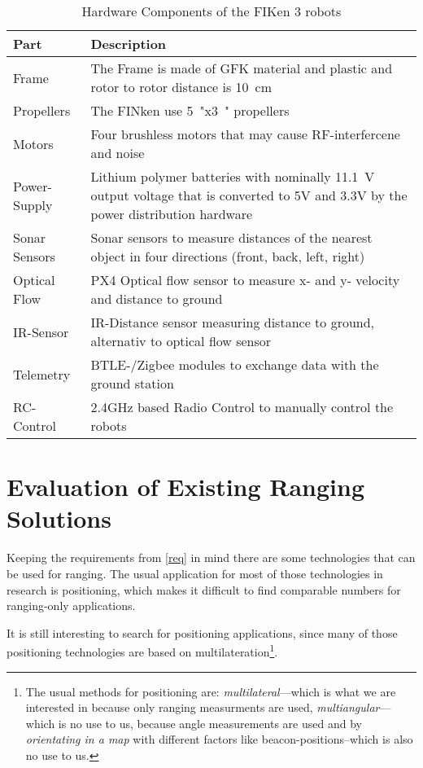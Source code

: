 \begin{table}[H]
	\begin{tabularx}{\columnwidth}{l | X}
	Part & Description \\ \hline
	Frame & The Frame is made of GFK material and plastic and rotor to rotor distance is \SI{10}{\centi\metre} \\
	Propellers & The FINken use \SI{5}{"}x\SI{3}{"} propellers \\
	Motors & Four brushless motors that may cause RF-interfercene and noise \\
	Power-Supply & Lithium polymer batteries with nominally \SI{11.1}{\volt} output voltage that is converted to 5V and 3.3V by the power distribution hardware \\
	Sonar Sensors & Sonar sensors to measure distances of the nearest object in four directions (front, back, left, right) \\
	Optical Flow & PX4 Optical flow sensor to measure x- and y- velocity and distance to ground \\
	IR-Sensor & IR-Distance sensor measuring distance to ground, alternativ to optical flow sensor \\
	Telemetry & BTLE-/Zigbee modules to exchange data with the ground station \\
	RC-Control &  2.4GHz based Radio Control to manually control the robots \\
	\end{tabularx}
	\caption{Hardware Components of the FIKen 3 robots}
\end{table}

\section{Evaluation of Existing Ranging Solutions}

Keeping the requirements from \autoref{req} in mind  there are some technologies that can be used for ranging.
The usual application for most of those technologies in research is positioning, which makes it difficult to find comparable numbers for ranging-only applications.



It is still interesting to search for positioning applications, since many of those positioning technologies are based on multilateration\footnote{The usual methods for positioning are: \emph{multilateral}—which is what we are interested in because only ranging measurments are used, \emph{multiangular}—which is no use  to us, because angle measurements are used and by \emph{orientating in a map} with different factors like beacon-positions–which is also no use to us.}.
\cite{_multilateration_2015}

